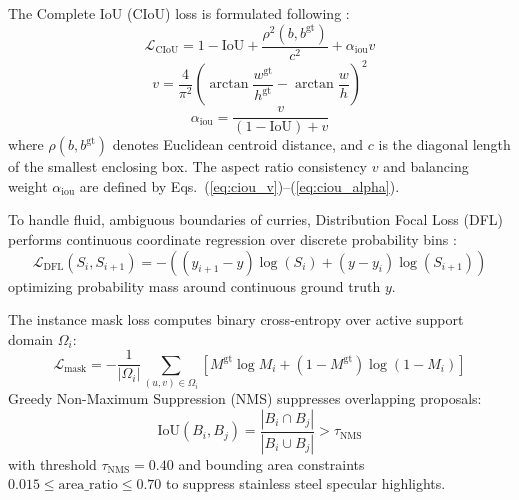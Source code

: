 \documentclass[conference]{IEEEtran}
\begin{document}
The Complete IoU (CIoU) loss is formulated following \cite{zheng2020distance}:
\begin{equation}
\mathcal{L}_{\text{CIoU}} = 1 - \text{IoU} + \frac{\rho^2(b, b^{\text{gt}})}{c^2} + \alpha_{\text{iou}} v
\label{eq:ciou_loss}
\end{equation}
\begin{equation}
v = \frac{4}{\pi^2} \left( \arctan \frac{w^{\text{gt}}}{h^{\text{gt}}} - \arctan \frac{w}{h} \right)^2
\label{eq:ciou_v}
\end{equation}
\begin{equation}
\alpha_{\text{iou}} = \frac{v}{(1 - \text{IoU}) + v}
\label{eq:ciou_alpha}
\end{equation}
where $\rho(b, b^{\text{gt}})$ denotes Euclidean centroid distance, and $c$ is the diagonal length of the smallest enclosing box. The aspect ratio consistency $v$ and balancing weight $\alpha_{\text{iou}}$ are defined by Eqs.~(\ref{eq:ciou_v})--(\ref{eq:ciou_alpha}).

To handle fluid, ambiguous boundaries of curries, Distribution Focal Loss (DFL) performs continuous coordinate regression over discrete probability bins \cite{lin2017focalloss, li2020generalized}:
\begin{equation}
\mathcal{L}_{\text{DFL}}(S_i, S_{i+1}) = - \left( (y_{i+1} - y)\log(S_i) + (y - y_i)\log(S_{i+1}) \right)
\label{eq:dfl_loss}
\end{equation}
optimizing probability mass around continuous ground truth $y$.

The instance mask loss computes binary cross-entropy over active support domain $\Omega_i$:
\begin{equation}
\mathcal{L}_{\text{mask}} = -\frac{1}{|\Omega_i|} \sum_{(u,v) \in \Omega_i} \left[ M^{\text{gt}} \log M_i + (1 - M^{\text{gt}}) \log(1 - M_i) \right]
\label{eq:mask_loss}
\end{equation}
Greedy Non-Maximum Suppression (NMS) suppresses overlapping proposals:
\begin{equation}
\text{IoU}(B_i, B_j) = \frac{|B_i \cap B_j|}{|B_i \cup B_j|} > \tau_{\text{NMS}}
\label{eq:nms}
\end{equation}
with threshold $\tau_{\text{NMS}} = 0.40$ and bounding area constraints $0.015 \le \text{area\_ratio} \le 0.70$ to suppress stainless steel specular highlights.
\end{document}
